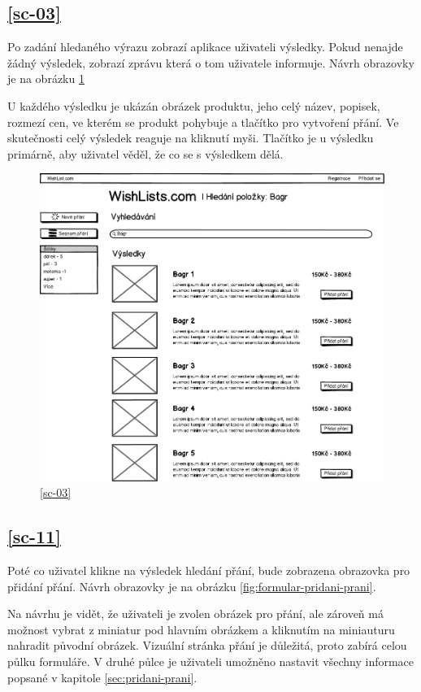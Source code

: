 \subsection{\ref{sc-03}}
Po zadání hledaného výrazu zobrazí aplikace uživateli výsledky. Pokud nenajde žádný výsledek, zobrazí zprávu která o tom uživatele informuje. Návrh obrazovky je na obrázku \ref{fig:vysledky-hledani}

U každého výsledku je ukázán obrázek produktu, jeho celý název, popisek, rozmezí cen, ve kterém se produkt pohybuje a tlačítko pro vytvoření přání. Ve skutečnosti celý výsledek reaguje na kliknutí myši. Tlačítko je u výsledku primárně, aby uživatel věděl, že co se s výsledkem dělá.

\begin{figure}[htb]
\begin{center}
\includegraphics[width=130mm]{./pictures/mock/vysledky-hledani.png}
\caption{\ref{sc-03}}
\label{fig:vysledky-hledani}
\end{center}
\end{figure}

\subsection{\ref{sc-11}}
Poté co uživatel klikne na výsledek hledání přání, bude zobrazena obrazovka pro přidání přání.  Návrh obrazovky je na obrázku \ref{fig:formular-pridani-prani}.

Na návrhu je vidět, že uživateli je zvolen obrázek pro přání, ale zároveň má možnost vybrat z miniatur pod hlavním obrázkem a kliknutím na miniauturu nahradit původní obrázek. Vizuální stránka přání je důležitá, proto zabírá celou půlku formuláře. V druhé půlce je uživateli umožněno nastavit všechny informace popsané v kapitole \ref{sec:pridani-prani}.

